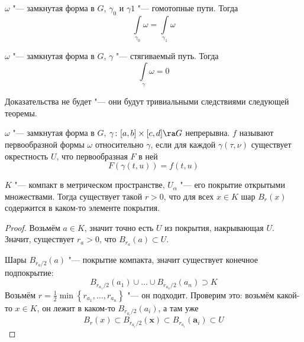 \begin{theorem}
	$\omega$ "--- замкнутая форма в $G$, $\gamma_0$ и $\gamma1$ "--- гомотопные пути.
	Тогда
	\[ \int\limits_{\gamma_0} \omega = \int\limits_{\gamma_1} \omega \]
\end{theorem}

\begin{theorem}
	$\omega$ "--- замкнутая форма в $G$, $\gamma$ "--- стягиваемый путь.
	Тогда
	\[ \int\limits_\gamma \omega = 0 \]
\end{theorem}

Доказательства не будет "--- они будут тривиальными следствиями следующей теоремы.

\begin{Def}
	$\omega$ "--- замкнутая форма в $G$, $\gamma\colon [a, b] \times [c, d] \ra G$ непрерывна.
	$f$ называют первообразной формы $\omega$ относительно $\gamma$, если для каждой $\gamma(\tau, \nu)$
	существует окрестность $U$, что первообразная $F$ в ней
	\[ F(\gamma(t, u)) = f(t, u) \]
\end{Def}

\begin{lemma}[Лебега]
	$K$ "--- компакт в метрическом пространстве, $U_\alpha$ "--- его покрытие открытыми множествами.
	Тогда существует такой $r > 0$, что для всех $x \in K$ шар $B_r(x)$ содержится в каком-то элементе покрытия.
\end{lemma}
\begin{proof}
	Возьмём $a \in K$, значит точно есть $U$ из покрытия, накрывающая $U$.
	Значит, существует $r_a > 0$, что $B_{r_a}(a) \subset U$.

	Шары $B_{r_a / 2}(a)$ "--- покрытие компакта, значит существует конечное подпокрытие:
	\[ B_{r_{a_1} / 2}(a_1) \cup \dots \cup B_{r_{a_n} / 2}(a_n) \supset K \]
	Возьмём $r = \frac12 \min \left\{ r_{a_1}, \dots, r_{a_n} \right\}$ "--- он подходит.
	Проверим это: возьмём какой-то $x \in K$, он лежит в каком-то $B_{r_{a_i} / 2}(a_i)$,
	а там уже
	\[ B_r(x) \subset B_{r_{a_i} / 2}(\mathbf x) \subset B_{r_{a_i}}(\mathbf a_i) \subset U\]
\end{proof}

